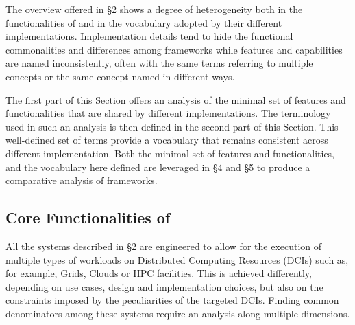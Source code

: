 \documentclass{sig-alternate}
\begin{document}
The overview offered in \S2 shows a degree of heterogeneity both in the functionalities of \pilotjobs and in the vocabulary adopted by their different implementations. Implementation details tend to hide the functional commonalities and differences among \pilotjobs frameworks while features and capabilities are named inconsistently, often with the same terms referring to multiple concepts or the same concept named in different ways.

The first part of this Section offers an analysis of the minimal set of features and functionalities that are shared by different \pilotjob implementations. The terminology used in such an analysis is then defined in the second part of this Section. This well-defined set of terms provide a vocabulary that remains consistent across different \pilotjob implementation. Both the minimal set of features and functionalities, and the  vocabulary here defined are leveraged in \S4 and \S5 to produce a comparative analysis of \pilotjobs frameworks.


\subsection{Core Functionalities of \pilotjobs}
\label{subsec:vocab_core_functionalities}


All the \pilotjob systems described in \S2 are engineered to allow for the
execution of multiple types of workloads on Distributed Computing Resources
(DCIs) such as, for example, Grids, Clouds or HPC facilities. This is achieved
differently, depending on use cases, design and implementation choices, but
also on the constraints imposed by the peculiarities of the targeted DCIs.
Finding common denominators among these systems require an analysis along
multiple dimensions.
\end{document}
